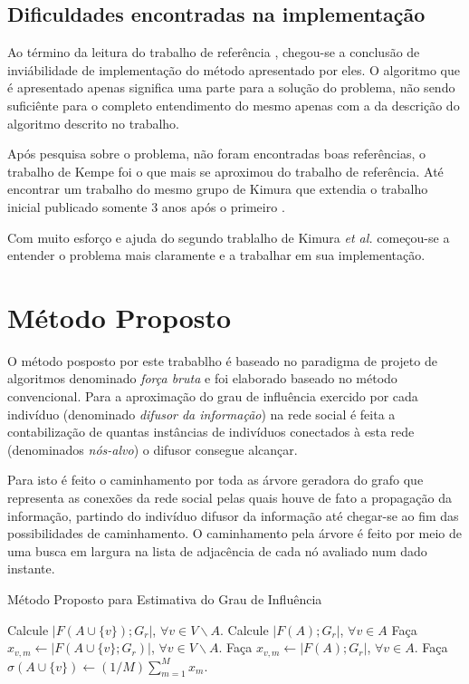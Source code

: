 \documentclass{acm_proc_article-sp}
\begin{document}
\subsection{Dificuldades encontradas na implementação}
Ao término da leitura do trabalho de referência \cite{kimura:2007}, chegou-se a conclusão de inviábilidade de
implementação do método apresentado por eles. O algoritmo que é apresentado apenas significa uma parte para a
solução do problema, não sendo suficiênte para o completo entendimento do mesmo apenas com a da descrição do
algoritmo descrito no trabalho.

Após pesquisa sobre o problema, não foram encontradas boas referências, o trabalho de Kempe\cite{kempe:2003} foi o
que mais se aproximou do trabalho de referência. Até encontrar um trabalho do mesmo grupo de Kimura que extendia o
trabalho inicial publicado somente 3 anos após o primeiro \cite{kimura:2010}.

Com muito esforço e ajuda do segundo trablalho de Kimura \textit{et al.} começou-se a entender o problema mais
claramente e a trabalhar em sua implementação. 

\section{Método Proposto}
O método posposto por este trabablho é baseado no paradigma de projeto de algoritmos denominado \textit{força
bruta} e foi elaborado baseado no método convencional. Para a aproximação do grau de influência exercido
por cada indivíduo (denominado \textit{difusor da informação}) na rede social é feita a contabilização de quantas 
instâncias de indivíduos conectados à esta rede (denominados \textit{nós-alvo}) o difusor consegue alcançar. 

Para isto é feito o caminhamento por toda as árvore geradora do grafo que representa as conexões da rede social
pelas quais houve de fato a propagação da informação, partindo do indivíduo difusor da informação até chegar-se ao
fim das possibilidades de caminhamento. O caminhamento pela árvore é feito por meio de uma busca em largura na
lista de adjacência de cada nó avaliado num dado instante.

\begin{algorithm}[H]
\caption{Método Proposto para Estimativa do Grau de Influência}\label{metodoproposto}
\begin{algorithmic}[1]
		\State Calcule $|F(A \cup \{v\});G_{r}|$, $\forall v \in V \backslash A$.
		\State Calcule $|F(A);G_{r}|$, $\forall v \in A$ 		
		\State Faça $x_{v,m} \gets |F(A \cup \{v\};G_{r})|$,  $\forall v \in V \backslash A$.
		\State Faça $x_{v,m} \gets |F(A);G_{r}|$,  $\forall v \in A$. 
	\EndFor
	\State Faça $\sigma(A \cup \{v\}) \gets (1/M)\sum^{M}_{m=1} x_{m}$.
\EndProcedure
\end{algorithmic}
\end{algorithm}
\end{document}
